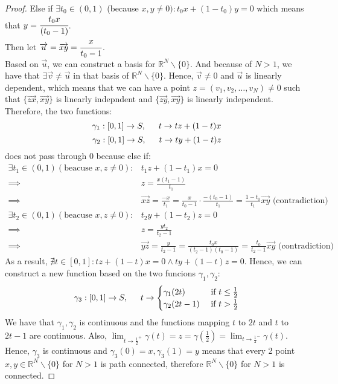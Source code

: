 \documentclass[11pt]{article}
\begin{document}
\begin{proof}
Else if $\exists t_0 \in (0,1)$ (because $x,y\ne 0): t_0x+ (1-t_0)y = 0$ which means that $y = \cfrac{t_0x}{(t_0-1)}$.\\
Then let $\overrightarrow{u} = \overrightarrow{xy} = \cfrac{x}{t_0-1}$. \\
Based on $\overrightarrow{u}$, we can construct a basis for $\mathbb{R}^{N} \backslash\{0\}$. And because of $N > 1$, we have that $\exists \overrightarrow{v}\ne \overrightarrow{u}$ in that basis of $\mathbb{R}^{N} \backslash\{0\}$. Hence, $\overrightarrow{v} \ne 0$ and  $\overrightarrow{u}$ is linearly dependent, which means that we can have a point $z = (v_1,v_2,\ldots, v_N) \ne 0$ such that $\{\overrightarrow{zx}, \overrightarrow{xy}\}$ is linearly indepndent and  $\{\overrightarrow{zy} , \overrightarrow{xy}\}$ is linearly independent. Therefore, the two functions:
\[\gamma_1: [0,1] \to S, \indent t \to tz+(1-t)x \]
\[\gamma_2: [0,1] \to S, \indent t \to ty+(1-t)z \]
does not pass through 0 because else if:
\begin{equation*}
\begin{aligned}
\exists t_1 \in (0,1) (\text{beacuse }x,z \ne 0): &t_1z + (1-t_1)x = 0 \\
\implies &z = \frac{x(t_1-1)}{t_1} \\
\implies &\overrightarrow{xz} = \frac{-x}{t_1} = \frac{x}{t_0-1} \cdot \frac{-(t_0-1)}{t_1} = \frac{1-t_0}{t_1} \overrightarrow{xy} \text{ (contradiction)}
\end{aligned}
\end{equation*}
\begin{equation}
\begin{aligned}
\exists t_2 \in (0,1) (\text{beacuse }x,z \ne 0): &t_2y + (1-t_2)z = 0 \\
\implies &z = \frac{yt_2}{t_2-1} \\
\implies &\overrightarrow{yz} = \frac{y}{t_2-1} = \frac{t_0x}{(t_2-1)(t_0-1)} = \frac{t_0}{t_2-1} \overrightarrow{xy} \text{ (contradiction)}
\end{aligned}
\end{equation}
As a result, $\nexists t \in [0,1]:  tz+(1-t)x = 0 \land  ty+(1-t)z = 0$.
Hence, we can construct a new function based on the two funcions $\gamma_1, \gamma_2$:
\[
\gamma_3: [0,1] \to S, \indent t \to \begin{cases} \gamma_1(2t) & \text{ if } t\le \frac{1}{2} \\ \gamma_2(2t-1) & \text{ if } t>\frac{1}{2}\end{cases}
\]
We have that $\gamma_1, \gamma_2$ is continuous and the functions mapping $t$ to $2t$ and $t$ to $2t-1$ are continuous.
Also, $\displaystyle{\lim_{t \to \frac{1}{2}^+}\gamma(t)} = z = \gamma(\frac{1}{2}) = \displaystyle{\lim_{t \to \frac{1}{2}^-}\gamma(t)}$. Hence, $\gamma_3$ is continuous and $\gamma_3(0) = x, \gamma_3(1) = y$ means that every 2 point $x,y \in \mathbb{R}^N \backslash\{0\}$ for $N>1$ is path connected, therefore $\mathbb{R}^N \backslash\{0\}$ for $N>1$ is connected. 
\end{proof}
\end{document}
